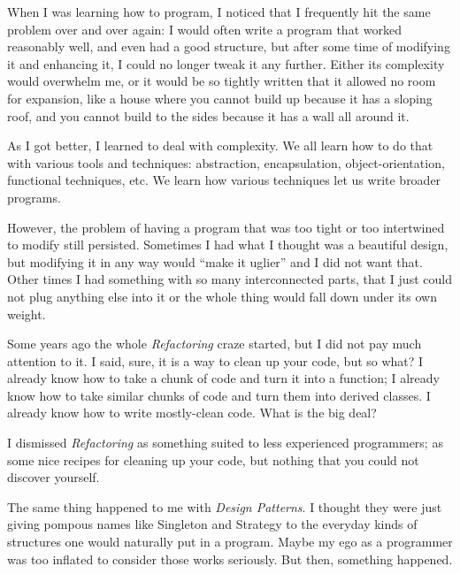 

When I was learning how to program, I noticed that I frequently hit the same
problem over and over again: I would often write a program that worked
reasonably well, and even had a good structure, but after some time of modifying
it and enhancing it, I could no longer tweak it any further. Either its
complexity would overwhelm me, or it would be so tightly written that it allowed
no room for expansion, like a house where you cannot build up because it has a
sloping roof, and you cannot build to the sides because it has a wall all around
it.

As I got better, I learned to deal with complexity. We all learn how to do that
with various tools and techniques: abstraction, encapsulation,
object-orientation, functional techniques, etc. We learn how various techniques
let us write broader programs.

However, the problem of having a program that was too tight or too intertwined
to modify still persisted. Sometimes I had what I thought was a beautiful
design, but modifying it in any way would ``make it uglier'' and I did not want
that. Other times I had something with so many interconnected parts, that I just
could not plug anything else into it or the whole thing would fall down under
its own weight.

Some years ago the whole \textit{Refactoring} craze started, but I did not pay
much attention to it. I said, sure, it is a way to clean up your code, but so
what? I already know how to take a chunk of code and turn it into a function; I
already know how to take similar chunks of code and turn them into derived
classes. I already know how to write mostly-clean code. What is the big deal?

I dismissed \textit{Refactoring} as something suited to less experienced
programmers; as some nice recipes for cleaning up your code, but nothing that
you could not discover yourself.

The same thing happened to me with \textit{Design Patterns}. I thought they were
just giving pompous names like Singleton and Strategy to the everyday kinds of
structures one would naturally put in a program. Maybe my ego as a programmer
was too inflated to consider those works seriously. But then, something
happened.

